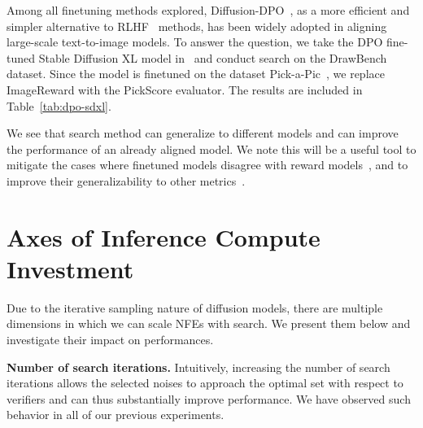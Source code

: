 \begin{table}
\centering
{}
\caption{\footnotesize{\textbf{\emph{Performance of Search with DPO-finetuned SDXL.}} We use random search with Verifier Ensemble on DrawBench to obtain the result. We set the denoising budget to $40$ NFEs, and search budget to $1280$ NFEs.}}
\vspace{-0.5cm}
\label{tab:dpo-sdxl}
\end{table}
Among all finetuning methods explored, Diffusion-DPO~\citep{wallace2024diffusion}, as a more efficient and simpler alternative to RLHF~\citep{ouyang2022training} methods, has been widely adopted in aligning large-scale text-to-image models. To answer the question, we take the DPO fine-tuned Stable Diffusion XL model in~\citep{wallace2024diffusion} and conduct search on the DrawBench dataset. Since the model is finetuned on the dataset Pick-a-Pic~\citep{kirstain2023pick}, we replace ImageReward with the PickScore evaluator. The results are included in Table~\ref{tab:dpo-sdxl}.

We see that search method can generalize to different models and can improve the performance of an already aligned model. We note this will be a useful tool to mitigate the cases where finetuned models disagree with reward models~\citep{hu2024new}, and to improve their generalizability to other metrics~\citep{clark2024directly}.


\section{Axes of Inference Compute Investment}
\label{sec:dimension}

Due to the iterative sampling nature of diffusion models, there are multiple dimensions in which we can scale NFEs with search. We present them below and investigate their impact on performances.

\textbf{Number of search iterations.} Intuitively, increasing the number of search iterations allows the selected noises to approach the optimal set with respect to verifiers and can thus substantially improve performance. We have observed such behavior in all of our previous experiments. 


